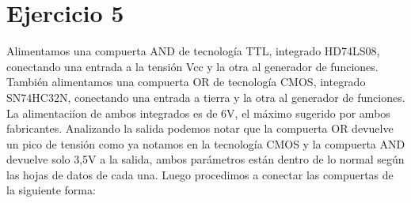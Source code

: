 \part*{Ejercicio 5}

Alimentamos una compuerta AND de tecnología TTL, integrado HD74LS08, conectando una entrada a la tensión Vcc y la otra al generador de funciones. Tambi\'en alimentamos una compuerta OR de tecnología CMOS, integrado SN74HC32N, conectando una entrada a tierra y la otra al generador de funciones. La alimentaciíon de ambos integrados es de 6V, el máximo sugerido por ambos fabricantes. Analizando la salida podemos notar que la compuerta OR devuelve un pico de tensión como ya notamos en la tecnología CMOS y la compuerta AND devuelve solo 3,5V a la salida, ambos parámetros están dentro de lo normal según las hojas de datos de cada una. Luego procedimos a conectar las compuertas de la siguiente forma:



